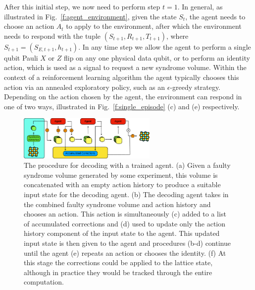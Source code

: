 \documentclass[twocolumn,preprintnumbers,amsmath,amssymb,notitlepage,nofootinbib,longbibliography,superscriptaddress,aps,pra,10pt]{revtex4-1}
\begin{document}
	After this initial step, we now need to perform step $t=1$.
	In general, as illustrated in Fig.~\ref{f:agent_environment}, given the state $S_t$, the agent needs to choose an action $A_t$ to apply to the environment, after which the environment needs to respond with the tuple $(S_{t+1}, R_{t+1}, T_{t+1})$, where $S_{t+1}=(S_{E,{t+1}},h_{t+1})$.
	In any time step we allow the agent to perform a single qubit Pauli $X$ or $Z$ flip on any one physical data qubit, or to perform an identity action, which is used as a signal to request a new syndrome volume.
	Within the context of a reinforcement learning algorithm the agent typically chooses this action via an annealed exploratory policy, such as an $\epsilon$-greedy strategy.
	Depending on the action chosen by the agent, the environment can respond in one of two ways, illustrated in Fig.~\ref{f:single_episode} (c) and (e) respectively.

	\begin{figure}
		\centering
		\includegraphics[width=0.6\textwidth]{figures/agent_decoding.pdf}
		\caption{
			The procedure for decoding with a trained agent.
			(a) Given a faulty syndrome volume generated by some experiment, this volume is concatenated with an empty action history to produce a suitable input state for the decoding agent.
			(b) The decoding agent takes in the combined faulty syndrome volume and action history and chooses an action.
			This action is simultaneously (c) added to a list of accumulated corrections and (d) used to update only the action history component of the input state to the agent.
			This updated input state is then given to the agent and procedures (b-d) continue until the agent (e) repeats an action or chooses the identity.
			(f) At this stage the corrections could be applied to the lattice state, although in practice they would be tracked through the entire computation.
		}
		\label{agent_decoding}
	\end{figure}
\end{document}
